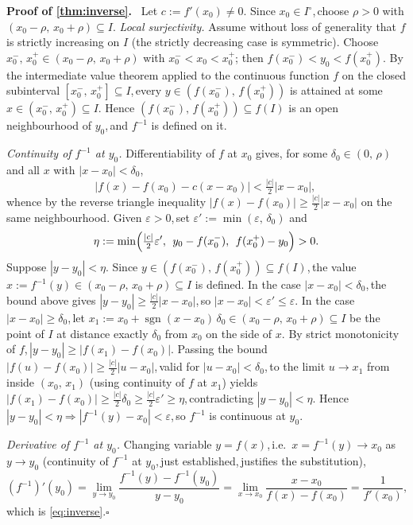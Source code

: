 \documentclass[11pt,reqno]{amsart}
\newcommand{\comma}{,\,\allowbreak}
\theoremstyle{redplain}
\renewenvironment{proof}[1][Proof]{\noindent\textbf{#1.}\ }{\ }
\begin{document}
\begin{proof}[Proof of \autoref{thm:inverse}]
	Let $c:=f'(x_0)\ne0$. Since $x_0\in I^\circ$\comma choose $\rho>0$ with $(x_0-\rho\comma x_0+\rho)\subseteq I$. \emph{Local surjectivity.} Assume without loss of generality that $f$ is strictly increasing on $I$ (the strictly decreasing case is symmetric). Choose $x_0^-\comma x_0^+\in(x_0-\rho\comma x_0+\rho)$ with $x_0^-<x_0<x_0^+$; then $f(x_0^-)<y_0<f(x_0^+)$. By the intermediate value theorem applied to the continuous function $f$ on the closed subinterval $[x_0^-\comma x_0^+]\subseteq I$\comma every $y\in(f(x_0^-)\comma f(x_0^+))$ is attained at some $x\in(x_0^-\comma x_0^+)\subseteq I$. Hence $(f(x_0^-)\comma f(x_0^+))\subseteq f(I)$ is an open neighbourhood of $y_0$\comma and $f^{-1}$ is defined on it.

	\emph{Continuity of $f^{-1}$ at $y_0$.} Differentiability of $f$ at $x_0$ gives, for some $\delta_0\in(0\comma\rho)$ and all $x$ with $|x-x_0|<\delta_0$\comma
	\[
	|f(x)-f(x_0)-c(x-x_0)|<\tfrac{|c|}{2}|x-x_0|\comma
	\]
	whence by the reverse triangle inequality $|f(x)-f(x_0)|\ge\tfrac{|c|}{2}|x-x_0|$ on the same neighbourhood. Given $\varepsilon>0$\comma set $\varepsilon':=\min(\varepsilon\comma\delta_0)$ and
	\[
	\eta:=\min\Bigl(\tfrac{|c|}{2}\varepsilon'\comma\;
	y_0-f(x_0^-)\comma\;f(x_0^+)-y_0\Bigr)>0.
	\]
	Suppose $|y-y_0|<\eta$. Since $y\in(f(x_0^-)\comma f(x_0^+))\subseteq f(I)$\comma the value $x:=f^{-1}(y)\in(x_0-\rho\comma x_0+\rho)\subseteq I$ is defined. In the case $|x-x_0|<\delta_0$\comma the bound above gives $|y-y_0|\ge\tfrac{|c|}{2}|x-x_0|$\comma so $|x-x_0|<\varepsilon'\le\varepsilon$. In the case $|x-x_0|\ge\delta_0$\comma let $x_1:=x_0+\operatorname{sgn}(x-x_0)\,\delta_0\in(x_0-\rho\comma x_0+\rho)\subseteq I$ be the point of $I$ at distance exactly $\delta_0$ from $x_0$ on the side of $x$. By strict monotonicity of $f$\comma $|y-y_0|\ge|f(x_1)-f(x_0)|$. Passing the bound $|f(u)-f(x_0)|\ge\tfrac{|c|}{2}|u-x_0|$\comma valid for $|u-x_0|<\delta_0$\comma to the limit $u\to x_1$ from inside $(x_0\comma x_1)$ (using continuity of $f$ at $x_1$) yields $|f(x_1)-f(x_0)|\ge\tfrac{|c|}{2}\delta_0\ge\tfrac{|c|}{2}\varepsilon'\ge\eta$\comma contradicting $|y-y_0|<\eta$. Hence $|y-y_0|<\eta\Rightarrow|f^{-1}(y)-x_0|<\varepsilon$\comma so $f^{-1}$ is continuous at $y_0$.

	\emph{Derivative of $f^{-1}$ at $y_0$.} Changing variable $y=f(x)$\comma i.e.\ $x=f^{-1}(y)\to x_0$ as $y\to y_0$ (continuity of $f^{-1}$ at $y_0$\comma just established\comma justifies the substitution),
	\[
	(f^{-1})'(y_0)=\lim_{y\to y_0}\frac{f^{-1}(y)-f^{-1}(y_0)}{y-y_0}=\lim_{x\to x_0}\frac{x-x_0}{f(x)-f(x_0)}=\frac{1}{f'(x_0)}\comma
	\]
	which is \autoref{eq:inverse}.\hfill$\square$
\end{proof}
\end{document}
